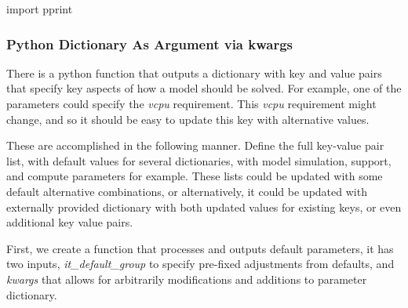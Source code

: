 \documentclass[
]{book}
\newenvironment{Shaded}{\begin{snugshade}}{\end{snugshade}}
\newcommand{\ImportTok}[1]{#1}
\newcommand{\NormalTok}[1]{#1}
\begin{document}
\begin{Shaded}
\begin{Highlighting}[]
\ImportTok{import}\NormalTok{ pprint}
\end{Highlighting}
\end{Shaded}

\hypertarget{python-dictionary-as-argument-via-kwargs}{%
\subsubsection{Python Dictionary As Argument via kwargs}\label{python-dictionary-as-argument-via-kwargs}}

There is a python function that outputs a dictionary with key and value pairs that specify key aspects of how a model should be solved. For example, one of the parameters could specify the \emph{vcpu} requirement. This \emph{vcpu} requirement might change, and so it should be easy to update this key with alternative values.

These are accomplished in the following manner. Define the full key-value pair list, with default values for several dictionaries, with model simulation, support, and compute parameters for example. These lists could be updated with some default alternative combinations, or alternatively, it could be updated with externally provided dictionary with both updated values for existing keys, or even additional key value pairs.

First, we create a function that processes and outputs default parameters, it has two inputs, \emph{it\_default\_group} to specify pre-fixed adjustments from defaults, and \emph{kwargs} that allows for arbitrarily modifications and additions to parameter dictionary.
\end{document}
